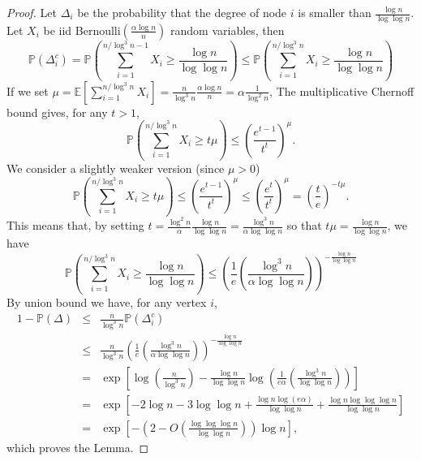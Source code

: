 \documentclass[english]{article}
\newcommand{\1}{\textbf{1}}
\newcommand{\OOO}{O}
\newcommand{\p}{\mathbb{P}}
\begin{document}
\begin{proof}
Let $\Delta_i$ be the probability that the degree of node $i$ is smaller than $\frac{\log n}{\log \log n}$. Let $X_i$ be iid Bernoulli$\left(\frac{\alpha\log n}{n}\right)$ random variables, then
\[
\p\left( \Delta_i^c \right) = \p\left( \sum_{i=1}^{n/\log^3n-1}X_i \geq \frac{\log n}{\log \log n} \right) \leq \p\left( \sum_{i=1}^{n/\log^3n}X_i \geq \frac{\log n}{\log \log n} \right)
\]
If we set $\mu = \mathbb{E}\left[ \sum_{i=1}^{n/\log^3n}X_i \right] = \frac{n}{\log^3n}\frac{\alpha\log n}n = \alpha\frac1{\log^2n}$, The multiplicative Chernoff bound gives, for any $t>1$,
\[
\p\left( \sum_{i=1}^{n/\log^3n}X_i \geq t \mu \right) \leq \left( \frac{e^{t-1}}{t^t} \right)^\mu.
\]
We consider a slightly weaker version (since $\mu >0$)
\[
\p\left( \sum_{i=1}^{n/\log^3n}X_i \geq t \mu \right) \leq \left( \frac{e^{t-1}}{t^t} \right)^\mu \leq \left( \frac{e^{t}}{t^t} \right)^\mu = \left( \frac{t}e \right)^{-t\mu}.
\] 
This means that, by setting $t = \frac{\log^2 n}{\alpha}\frac{\log n}{\log \log n} =\frac{\log^3 n}{\alpha \log \log n}$ so that $t\mu = \frac{\log n}{\log \log n}$, we have
\[
\p\left( \sum_{i=1}^{n/\log^3n}X_i \geq \frac{\log n}{\log \log n} \right)  \leq  \left( \frac1{e}\left( \frac{\log^3 n}{\alpha \log \log n} \right) \right)^{-\frac{\log n}{\log \log n}}
\]
By union bound we have, for any vertex $i$,
\begin{eqnarray*}
1 - \p\left( \Delta \right) & \leq & \frac{n}{\log^3 n} \p\left( \Delta_i^c \right) \\
 & \leq & \frac{n}{\log^3 n} \left( \frac1{e}\left( \frac{\log^3 n}{\alpha \log \log n} \right) \right)^{-\frac{\log n}{\log \log n}}\\
  & = & \exp\left[ \log\left( \frac{n}{\log^3 n} \right) - \frac{\log n}{\log \log n} \log\left( \frac1{e\alpha}\left( \frac{\log^3 n}{ \log \log n} \right) \right)  \right]\\
  & = & \exp\left[ -2\log n - 3\log\log n + \frac{\log n \log(e\alpha)}{\log \log n}  +\frac{\log n\log\log\log n}{\log \log n}      \right]\\
  & = & \exp\left[ -\left(2 - \OOO\left( \frac{\log\log\log n}{\log\log n} \right) \right)\log n\right], 
\end{eqnarray*}
which proves the Lemma.



\end{proof}
\end{document}
